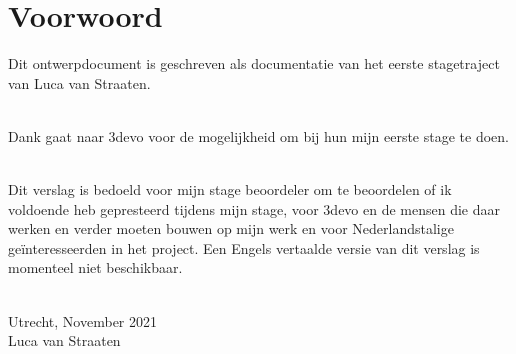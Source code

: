\chapter*{Voorwoord}

Dit ontwerpdocument is geschreven als documentatie van het eerste stagetraject
van Luca van Straaten.\\\

Dank gaat naar 3devo voor de mogelijkheid om bij hun mijn eerste stage te doen.\\\

Dit verslag is bedoeld voor mijn stage beoordeler om te beoordelen of ik voldoende heb gepresteerd tijdens mijn stage, voor 3devo en de mensen die daar werken en verder moeten bouwen op mijn werk en voor Nederlandstalige geïnteresseerden in het project. Een Engels vertaalde versie van dit verslag is momenteel niet beschikbaar.\\\

Utrecht, November 2021\\Luca van Straaten
